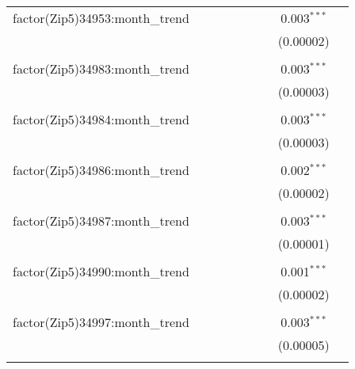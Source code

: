 \begin{table}[H]
{\begin{tabular}{@{\extracolsep{5pt}}lcccccccc}
  factor(Zip5)34953:month\_trend &  &  &  &  &  &  & 0.003$^{***}$ &  \\  

   &  &  &  &  &  &  & (0.00002) &  \\  

   & & & & & & & & \\  

  factor(Zip5)34983:month\_trend &  &  &  &  &  &  & 0.003$^{***}$ &  \\  

   &  &  &  &  &  &  & (0.00003) &  \\  

   & & & & & & & & \\  

  factor(Zip5)34984:month\_trend &  &  &  &  &  &  & 0.003$^{***}$ &  \\  

   &  &  &  &  &  &  & (0.00003) &  \\  

   & & & & & & & & \\  

  factor(Zip5)34986:month\_trend &  &  &  &  &  &  & 0.002$^{***}$ &  \\  

   &  &  &  &  &  &  & (0.00002) &  \\  

   & & & & & & & & \\  

  factor(Zip5)34987:month\_trend &  &  &  &  &  &  & 0.003$^{***}$ &  \\  

   &  &  &  &  &  &  & (0.00001) &  \\  

   & & & & & & & & \\  

  factor(Zip5)34990:month\_trend &  &  &  &  &  &  & 0.001$^{***}$ &  \\  

   &  &  &  &  &  &  & (0.00002) &  \\  

   & & & & & & & & \\  

  factor(Zip5)34997:month\_trend &  &  &  &  &  &  & 0.003$^{***}$ &  \\  

   &  &  &  &  &  &  & (0.00005) &  \\  

   & & & & & & & & \\  


\end{tabular}}
\end{table}
